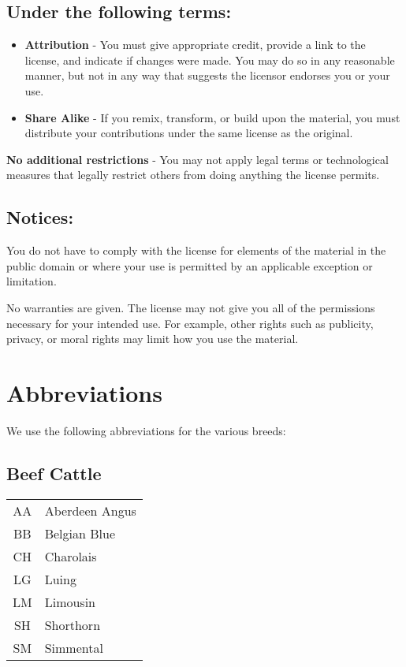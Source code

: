 \documentclass[a4paper,11pt]{report}
\begin{document}
	\subsection*{Under the following terms:}
	\begin{itemize}
		\item \textbf{Attribution} - You must give appropriate credit, provide a link to the license, and indicate if changes were made. You may do so in any reasonable manner, but not in any way that suggests the licensor endorses you or your use.
		\item \textbf{Share Alike} - If you remix, transform, or build upon the material, you must distribute your contributions under the same license as the original.
	\end{itemize}
	\textbf{No additional restrictions} - You may not apply legal terms or technological measures that legally restrict others from doing anything the license permits.
	\subsection*{Notices:}
	You do not have to comply with the license for elements of the material in the public domain or where your use is permitted by an applicable exception or limitation.
	
	No warranties are given. The license may not give you all of the permissions necessary for your intended use. For example, other rights such as publicity, privacy, or moral rights may limit how you use the material.

\newpage

	\section*{Abbreviations}
	We use the following abbreviations for the various breeds:
	\subsection*{Beef Cattle}
	\begin{tabular}{cl}
		AA & Aberdeen Angus \\
		BB & Belgian Blue \\
		CH & Charolais \\
		LG & Luing \\
		LM & Limousin \\
		SH & Shorthorn\\
		SM & Simmental \\
	\end{tabular}
\end{document}
